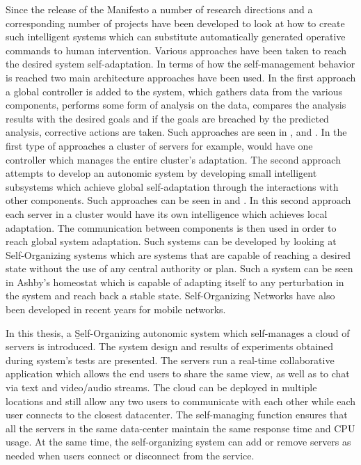 Since the release of the Manifesto a number of research directions and a corresponding number of projects have been developed to look at how to create such intelligent systems which can substitute automatically generated operative commands to human intervention. Various approaches have been taken to reach the desired system self-adaptation. In terms of how the self-management behavior is reached two main architecture approaches have been used. In the first approach a global controller is added to the system, which gathers data from the various components, performs some form of analysis on the data, compares the analysis results with the desired goals and if the goals are breached by the predicted analysis, corrective actions are taken. Such approaches are seen in \cite{related:architecture:hierarch1}, \cite{related:model:lqm} and \cite{bogdan:seams07}. In the first type of approaches a cluster of servers for example, would have one controller which manages the entire cluster's adaptation. The second approach attempts to develop an autonomic system by developing small intelligent subsystems which achieve global self-adaptation through the interactions with other components. Such approaches can be seen in \cite{related:architecture:selflet} and \cite{related:architecture:unity}. In this second approach each server in a cluster would have its own intelligence which achieves local adaptation. The communication between components is then used in order to reach global system adaptation. Such systems can be developed by looking at Self-Organizing systems which are systems that are capable of reaching a desired state without the use of any central authority or plan. Such a system can be seen in Ashby's homeostat \cite{ashby:homeostat} which is capable of adapting itself to any perturbation in the system and reach back a stable state. Self-Organizing Networks have also been developed in recent years for mobile networks.

In this thesis, a \b{Self-Organizing autonomic system} which self-manages a cloud of servers is introduced. The system design and results of experiments obtained during system's tests are presented. The servers run a real-time collaborative application which allows the end users to share the same view, as well as to chat via text and video/audio streams. The cloud can be deployed in multiple locations and still allow any two users to communicate with each other while each user connects to the closest datacenter. The self-managing function ensures that all the servers in the same data-center maintain the same response time and CPU usage. At the same time, the self-organizing system can add or remove servers as needed when users connect or disconnect from the service.

